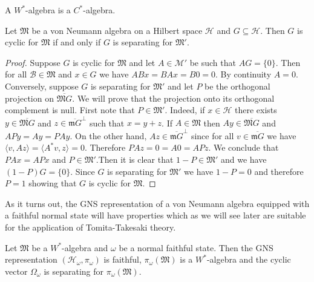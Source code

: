 \begin{corollary}\label{cor:W_C}
A $W^*$-algebra is a $C^*$-algebra.
\end{corollary}

\begin{theorem}
Let $\mathfrak{M}$ be a von Neumann algebra on a Hilbert space $\mathcal{H}$ and $G\subseteq\mathcal{H}$. Then $G$ is cyclic for $\mathfrak{M}$ if and only if $G$ is separating for $\mathfrak{M}'$.
\end{theorem}

\begin{proof}
Suppose $G$ is cyclic for $\mathfrak{M}$ and let $A\in\mathcal{M}'$ be such that $AG=\{0\}$. Then for all $\mathcal{B}\in\mathfrak{M}$ and $x\in G$ we have $ABx=BAx=B0=0$. By continuity $A=0$.
Conversely, suppose $G$ is separating for $\mathfrak{M}'$ and let $P$ be the orthogonal projection on $\overline{\mathfrak{M}G}$. We will prove that the projection onto its orthogonal complement is null. First note that $P\in\mathfrak{M}'$. Indeed, if $x\in\mathcal{H}$ there exists $y\in \overline{\mathfrak{M}G}$ and $z\in\overline{\mathfrak{m}G}^\bot$ such that $x=y+z$. If $A\in\mathfrak{M}$ then $Ay\in\overline{\mathfrak{M}G}$ and $APy=Ay=PAy$. On the other hand, $Az\in\overline{\mathfrak{m}G}^\bot$ since for all $v\in\overline{\mathfrak{m}G}$ we have $\langle v,Az\rangle=\langle A^*v,z\rangle=0$. Therefore $PAz=0=A0=APz$. We conclude that $PAx=APx$ and $P\in\mathfrak{M}'$.Then it is clear that $1-P\in\mathfrak{M}'$ and we have $(1-P)G=\{0\}$. Since $G$ is separating for $\mathfrak{M}'$ we have $1-P=0$ and therefore $P=1$ showing that $G$ is cyclic for $\mathfrak{M}$.
\end{proof}

As it turns out, the GNS representation of a von Neumann algebra equipped with a faithful normal state will have properties which as we will see later are suitable for the application of Tomita-Takesaki theory.

\begin{theorem}\label{thm:GNS_von}
Let $\mathfrak{M}$ be a $W^*$-algebra and $\omega$ be a normal faithful state. Then the GNS representation $(\mathcal{H}_\omega,\pi_\omega)$ is faithful, $\pi_\omega(\mathfrak{M})$ is a $W^*$-algebra and the cyclic vector $\Omega_\omega$ is separating for $\pi_\omega(\mathfrak{M})$.
\end{theorem} 

